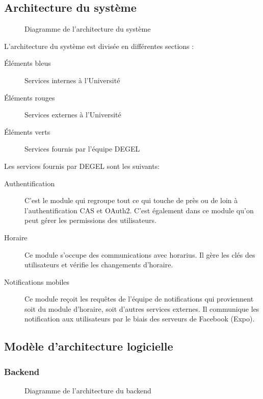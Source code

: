     \subsection{Architecture du système}
    \begin{figure}[hp] \centering
        
        \caption{Diagramme de l'architecture du système}
        \label{fig.architectureSysteme}
    \end{figure}
    
    L'architecture du système est divisée en différentes sections :
    \begin{description}
        \item[Éléments bleus] Services internes à l'Université
        \item[Éléments rouges] Services externes à l'Université
        \item[Éléments verts] Services fournis par l'équipe DEGEL
    \end{description}

    Les services fournis par DEGEL sont les suivants:
    \begin{description}
        \item[Authentification] C'est le module qui regroupe tout ce qui touche de près ou de loin à l'authentification CAS et OAuth2. C'est également dans ce module qu'on peut gérer les permissions des utilisateurs.
        \item[Horaire] Ce module s'occupe des communications avec horarius. Il gère les clés des utilisateurs et vérifie les changements d'horaire.
        \item[Notifications mobiles] Ce module reçoit les requêtes de l'équipe de notifications qui proviennent soit du module d'horaire, soit d'autres services externes. Il communique les notification aux utilisateurs par le biais des serveurs de Facebook (Expo).
    \end{description}

    \subsection{Modèle d'architecture logicielle}
        \subsubsection{Backend}
        \begin{figure}[hp] \centering
            
            \caption{Diagramme de l'architecture du backend}
            \label{fig.architectureBackend}
        \end{figure}
        
